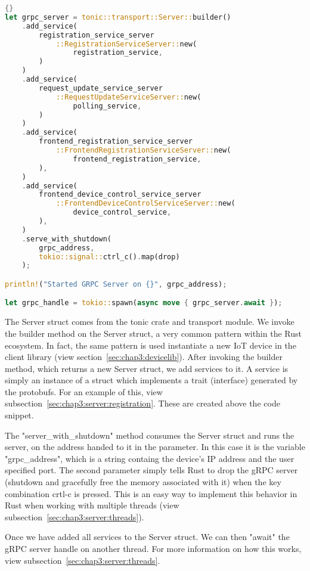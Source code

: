\begin{lstlisting}[language=Rust, style=boxed, showstringspaces=false]{}
let grpc_server = tonic::transport::Server::builder()
    .add_service(
        registration_service_server
            ::RegistrationServiceServer::new(
                registration_service,
        )
    )
    .add_service(
        request_update_service_server
            ::RequestUpdateServiceServer::new(
                polling_service,
        )
    )
    .add_service(
        frontend_registration_service_server
            ::FrontendRegistrationServiceServer::new(
                frontend_registration_service,
        ),
    )
    .add_service(
        frontend_device_control_service_server
            ::FrontendDeviceControlServiceServer::new(
                device_control_service,
        ),
    )
    .serve_with_shutdown(
        grpc_address,
        tokio::signal::ctrl_c().map(drop)
    );

println!("Started GRPC Server on {}", grpc_address);

let grpc_handle = tokio::spawn(async move { grpc_server.await });
\end{lstlisting}

The Server struct comes from the tonic crate and transport module. We invoke the builder method on the Server struct, a very common pattern within the Rust ecosystem. In fact, the same pattern is used instantiate a new IoT device in the client library (view section~\ref{sec:chap3:devicelib}). After invoking the builder method, which returns a new Server struct, we add services to it. A service is simply an instance of a struct which implements a trait (interface) generated by the protobufs. For an example of this, view subsection~\ref{sec:chap3:server:registration}. These are created above the code snippet.

The "server\_with\_shutdown" method consumes the Server struct and runs the server, on the address handed to it in the parameter. In this case it is the variable "grpc\_address", which is a string containg the device's IP address and the user specified port. The second parameter simply tells Rust to drop the gRPC server (shutdown and gracefully free the memory associated with it) when the key combination crtl-c is pressed. This is an easy way to implement this behavior in Rust when working with multiple threads (view subsection~\ref{sec:chap3:server:threads}).

Once we have added all services to the Server struct. We can then "await" the gRPC server handle on another thread. For more information on how this works, view subsection~\ref{sec:chap3:server:threads}.  


